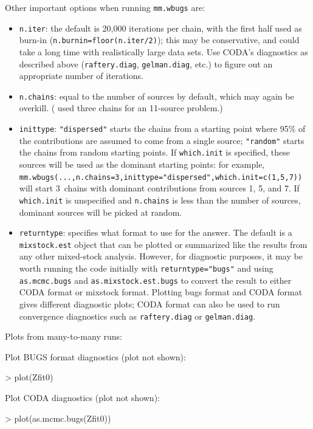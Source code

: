 \documentclass[11pt]{article}
\begin{document}
Other important options when running {\tt mm.wbugs} are:
\begin{itemize}
\item {\tt n.iter}: the default is 20,000 iterations per chain, with
  the first half used as burn-in ({\tt n.burnin=floor(n.iter/2)});
  this may be conservative, and could take a long time with
  realistically large data sets.  Use CODA's diagnostics as
  described above ({\tt raftery.diag}, {\tt gelman.diag}, etc.)
  to figure out an appropriate number of iterations.
\item {\tt n.chains}: equal to the number of sources by default,
  which may again be overkill.  (\cite{Bolker+07} used three chains
  for an 11-source problem.)
\item {\tt inittype}: {\tt "dispersed"} starts the chains from 
  a starting point where 95\% of the contributions are assumed to
  come from a single source; {\tt "random"} starts the chains from
  random starting points.  If {\tt which.init} is specified, these
  sources will be used as the dominant starting points: for example,
  {\tt mm.wbugs(...,n.chains=3,inittype="dispersed",which.init=c(1,5,7))} will 
  start 3~chains with dominant contributions from sources 1, 5, and 7.  If
  {\tt which.init} is unspecified and {\tt n.chains} is less than the
  number of sources, dominant sources will be picked at random.
\item {\tt returntype}: specifies what format to use for the answer.
  The default is a {\tt mixstock.est} object that can be plotted
  or summarized like the results from any other mixed-stock analysis.
  However, for diagnostic purposes, it may be worth running the
  code initially with {\tt returntype="bugs"}
  and using {\tt as.mcmc.bugs} and {\tt as.mixstock.est.bugs}
  to convert the result to either CODA format or mixstock
  format.  Plotting bugs format and CODA format gives different
  diagnostic plots; CODA format can also be used to run
  convergence diagnostics such as {\tt raftery.diag} or
  {\tt gelman.diag}.
\end{itemize}

Plots from many-to-many runs:

Plot BUGS format diagnostics (plot not shown):
\begin{Schunk}
\begin{Sinput}
> plot(Zfit0)
\end{Sinput}
\end{Schunk}

Plot CODA diagnostics (plot not shown):
\begin{Schunk}
\begin{Sinput}
> plot(as.mcmc.bugs(Zfit0))
\end{Sinput}
\end{Schunk}
\end{document}
